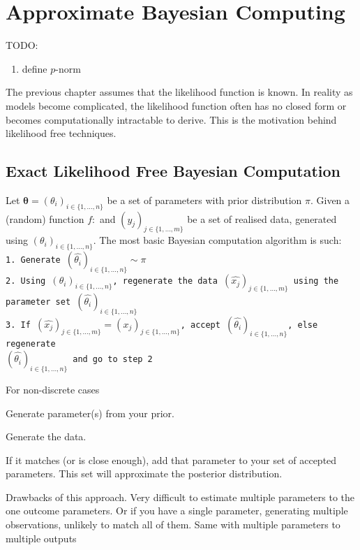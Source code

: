 \chapter{Approximate Bayesian Computing}

TODO: \begin{enumerate}
    \item define $p$-norm
\end{enumerate}

The previous chapter assumes that the likelihood function is known. In reality as models become complicated, the likelihood function often has no closed form or becomes computationally intractable to derive. This is the motivation behind likelihood free techniques.

\section{Exact Likelihood Free Bayesian Computation}

Let $\bm{\theta} = (\theta_i)_{i\in \{1,\dots, n\}}$ be a set of parameters with prior distribution $\pi.$ Given a (random) function $f:$ and $(y_j)_{j\in \{1,\dots, m\}}$ be a set of realised data, generated using $(\theta_i)_{i\in \{1,\dots, n\}}$. The most basic Bayesian computation algorithm is such:
\texttt{\\
    1. Generate $(\hat{\theta_i})_{i\in \{1,\dots, n\}}\sim \pi$\\
    2. Using $(\theta_i)_{i\in \{1,\dots, n\}}$, regenerate the data $(\hat{x_j})_{j\in \{1,\dots, m\}}$ using the\\ parameter set $(\hat{\theta_i})_{i\in \{1,\dots, n\}}$\\
    3. If $(\hat{x_j})_{j\in \{1,\dots, m\}} = (x_j)_{j\in \{1,\dots, m\}}$, accept $(\hat{\theta_i})_{i\in \{1,\dots, n\}}$, else regenerate\\ $(\hat{\theta_i})_{i\in \{1,\dots, n\}}$ and go to step 2
}

For non-discrete cases

Generate parameter(s) from your prior.

Generate the data.

If it matches (or is close enough), add that parameter to your set of accepted parameters. This set will approximate the posterior distribution.

Drawbacks of this approach. Very difficult to estimate multiple parameters to the one outcome parameters. Or if you have a single parameter, generating multiple observations, unlikely to match all of them. Same with multiple parameters to multiple outputs

